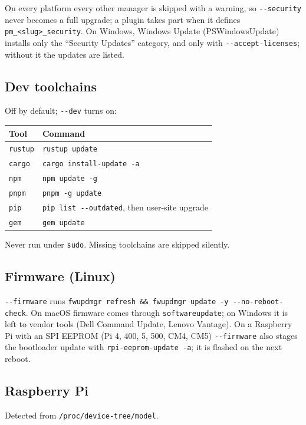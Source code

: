 \documentclass[11pt,a4paper]{article}
\begin{document}
On every platform every other manager is skipped with a warning, so
\texttt{-{}-security} never becomes a full upgrade; a plugin takes part
when it defines \verb|pm_<slug>_security|. On Windows,
Windows Update (PSWindowsUpdate) installs only the ``Security Updates''
category, and only with \texttt{-{}-accept-licenses}; without it the
updates are listed.

\subsection{Dev toolchains}
Off by default; \texttt{-{}-dev} turns on:

\begin{center}
\begin{tabular}{@{}ll@{}}
\toprule
\textbf{Tool} & \textbf{Command} \\
\midrule
\texttt{rustup}  & \texttt{rustup update} \\
\texttt{cargo}   & \texttt{cargo install-update -a} \\
\texttt{npm}     & \texttt{npm update -g} \\
\texttt{pnpm}    & \texttt{pnpm -g update} \\
\texttt{pip}     & \texttt{pip list -{}-outdated}, then user-site upgrade \\
\texttt{gem}     & \texttt{gem update} \\
\bottomrule
\end{tabular}
\end{center}

Never run under \texttt{sudo}. Missing toolchains are skipped silently.

\subsection{Firmware (Linux)}
\texttt{-{}-firmware} runs
\texttt{fwupdmgr refresh \&\& fwupdmgr update -y -{}-no-reboot-check}.
On macOS firmware comes through \texttt{softwareupdate}; on Windows it is
left to vendor tools (Dell Command Update, Lenovo Vantage).
On a Raspberry Pi with an SPI EEPROM (Pi 4, 400, 5, 500, CM4, CM5)
\texttt{-{}-firmware} also stages the bootloader update with
\texttt{rpi-eeprom-update -a}; it is flashed on the next reboot.

\subsection{Raspberry Pi}\label{sec:rpi}
Detected from \verb|/proc/device-tree/model|.
\end{document}
